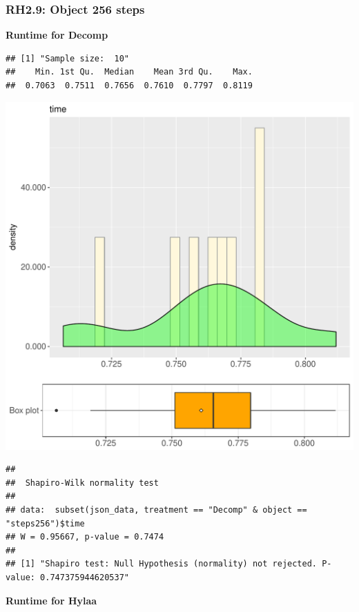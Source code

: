 \documentclass{article}\usepackage[]{graphicx}\usepackage[]{color}
\makeatletter
\def\maxwidth{ %
  \ifdim\Gin@nat@width>\linewidth
    \linewidth
  \else
    \Gin@nat@width
  \fi
}
\newenvironment{kframe}{%
 \def\at@end@of@kframe{}%
 \ifinner\ifhmode%
  \def\at@end@of@kframe{\end{minipage}}%
  \begin{minipage}{\columnwidth}%
 \fi\fi%
 \def\FrameCommand##1{\hskip\@totalleftmargin \hskip-\fboxsep
 \colorbox{shadecolor}{##1}\hskip-\fboxsep
     \hskip-\linewidth \hskip-\@totalleftmargin \hskip\columnwidth}%
 \MakeFramed {\advance\hsize-\width
   \@totalleftmargin\z@ \linewidth\hsize
   \@setminipage}}%
 {\par\unskip\endMakeFramed%
 \at@end@of@kframe}
\newenvironment{knitrout}{}{} %
\makeatother
\begin{document}
\subsubsection{RH2.9: Object 256 steps}

 \textbf{Runtime for Decomp}
\begin{knitrout}
\color{fgcolor}\begin{kframe}
\begin{verbatim}
## [1] "Sample size:  10"
##    Min. 1st Qu.  Median    Mean 3rd Qu.    Max. 
##  0.7063  0.7511  0.7656  0.7610  0.7797  0.8119
\end{verbatim}
\end{kframe}
\includegraphics[width=\maxwidth]{figure/RH2_Decomp_steps256-1} 
\begin{kframe}\begin{verbatim}
## 
## 	Shapiro-Wilk normality test
## 
## data:  subset(json_data, treatment == "Decomp" & object == "steps256")$time
## W = 0.95667, p-value = 0.7474
## 
## [1] "Shapiro test: Null Hypothesis (normality) not rejected. P-value: 0.747375944620537"
\end{verbatim}
\end{kframe}
\end{knitrout}
 \textbf{Runtime for Hylaa}
\end{document}
